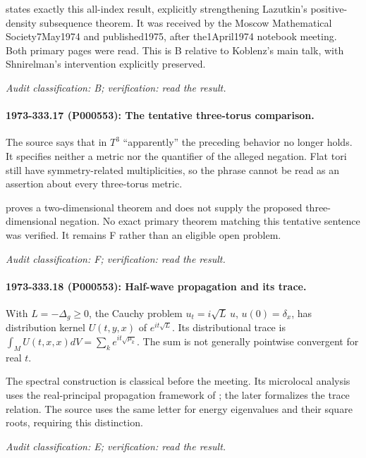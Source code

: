 \citet[Theorem and Lemmas1--3, pp.~265--266]{shnirelman1975multiplicity} states exactly this all-index result, explicitly strengthening Lazutkin’s positive-density subsequence theorem. It was received by the Moscow Mathematical Society7May1974 and published1975, after the1April1974 notebook meeting. Both primary pages were read. This is B relative to Koblenz’s main talk, with Shnirelman’s intervention explicitly preserved.

\emph{Audit classification: B; verification: read the result.}

\paragraph{1973-333.17 (P000553): The tentative three-torus comparison.}
The source says that in \(T^3\) “apparently” the preceding behavior no longer holds. It specifies neither a metric nor the quantifier of the alleged negation. Flat tori still have symmetry-related multiplicities, so the phrase cannot be read as an assertion about every three-torus metric.

\citet{shnirelman1975multiplicity} proves a two-dimensional theorem and does not supply the proposed three-dimensional negation. No exact primary theorem matching this tentative sentence was verified. It remains F rather than an eligible open problem.

\emph{Audit classification: F; verification: read the result.}

\paragraph{1973-333.18 (P000553): Half-wave propagation and its trace.}
With \(L=-\Delta_g\ge0\), the Cauchy problem \(u_t=i\sqrt L\,u\), \(u(0)=\delta_x\), has distribution kernel \(U(t,y,x)\) of \(e^{it\sqrt L}\). Its distributional trace is \(\int_M U(t,x,x)dV=\sum_k e^{it\sqrt{\mu_k}}\). The sum is not generally pointwise convergent for real \(t\).

The spectral construction is classical before the meeting. Its microlocal analysis uses the real-principal propagation framework of \citet[\S6.1]{duistermaathormander1972fourierii}; the later \citet{duistermaatguillemin1975spectrum} formalizes the trace relation. The source uses the same letter for energy eigenvalues and their square roots, requiring this distinction.

\emph{Audit classification: E; verification: read the result.}

